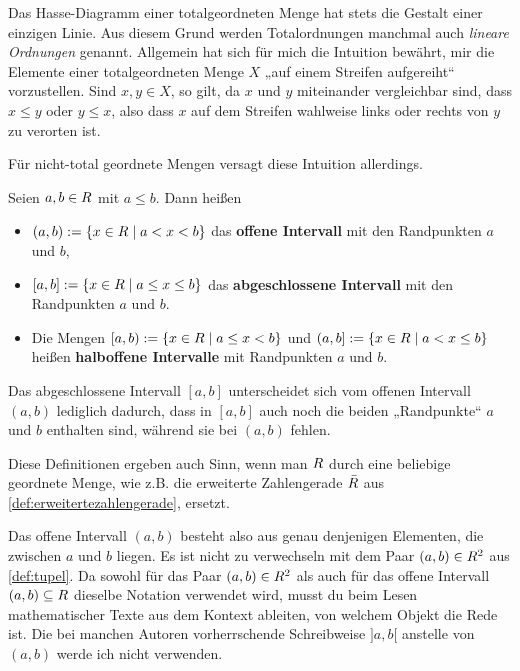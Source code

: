 \begin{bem}
    Das Hasse-Diagramm einer totalgeordneten Menge hat stets die Gestalt einer einzigen Linie. Aus diesem Grund werden Totalordnungen manchmal auch \emph{lineare Ordnungen} genannt. Allgemein hat sich für mich die Intuition bewährt, mir die Elemente einer totalgeordneten Menge $X$ „auf einem Streifen aufgereiht“ vorzustellen. Sind $x,y\in X$, so gilt, da $x$ und $y$ miteinander vergleichbar sind, dass $x\le y$ oder $y\le x$, also dass $x$ auf dem Streifen wahlweise links oder rechts von $y$ zu verorten ist.

    Für nicht-total geordnete Mengen versagt diese Intuition allerdings.
\end{bem}


\begin{defin}[Intervalle in $\R$] \label{def:intervall} 
    Seien $a,b\in \relax R$ mit $a\le b$. Dann heißen
    \begin{itemize}
        \item $(a,b) := \{ x\in \relax R \mid a<x<b \}$ das \textbf{offene Intervall} mit den Randpunkten $a$ und $b$,
        \item $[a,b] := \{ x\in \relax R \mid a\le x\le b \}$ das \textbf{abgeschlossene Intervall} mit den Randpunkten $a$ und $b$.
        \item Die Mengen $[a,b) := \{ x\in \relax R \mid a\le x<b \}$ und $(a,b] := \{ x\in \relax R \mid a<x\le b \}$ heißen \textbf{halboffene Intervalle} mit Randpunkten $a$ und $b$. 
    \end{itemize}
    Das abgeschlossene Intervall $[a,b]$ unterscheidet sich vom offenen Intervall $(a,b)$ lediglich dadurch, dass in $[a,b]$ auch noch die beiden „Randpunkte“ $a$ und $b$ enthalten sind, während sie bei $(a,b)$ fehlen.

    Diese Definitionen ergeben auch Sinn, wenn man $\R$ durch eine beliebige geordnete Menge, wie z.B. die erweiterte Zahlengerade $\bar {\relax R}$ aus \cref{def:erweitertezahlengerade}, ersetzt.
\end{defin}


\begin{nota}
    Das offene Intervall $(a,b)$ besteht also aus genau denjenigen Elementen, die zwischen $a$ und $b$ liegen. Es ist nicht zu verwechseln mit dem Paar $(a,b)\in \relax R^2$ aus \cref{def:tupel}. Da sowohl für das Paar $(a,b)\in \relax R^2$ als auch für das offene Intervall $(a,b)\subseteq \relax R$ dieselbe Notation verwendet wird, musst du beim Lesen mathematischer Texte aus dem Kontext ableiten, von welchem Objekt die Rede ist. Die bei manchen Autoren vorherrschende Schreibweise $]a,b[$ anstelle von $(a,b)$ werde ich nicht verwenden.
\end{nota}


